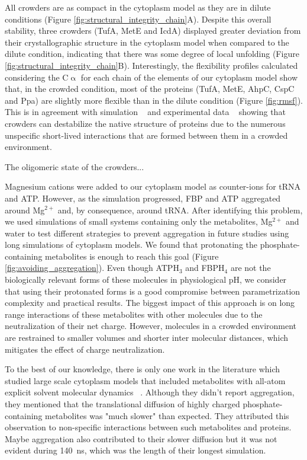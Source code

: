 \documentclass[journal=jacsat,manuscript=article]{achemso}
\begin{document}
All crowders are as compact in the cytoplasm model as they are in dilute conditions (Figure \ref{fig:structural_integrity_chain}A). Despite this overall stability, three crowders (TufA, MetE and IcdA) displayed greater deviation from their crystallographic structure in the cytoplasm model when compared to the dilute condition, indicating that there was some degree of local unfolding (Figure \ref{fig:structural_integrity_chain}B). Interestingly, the flexibility profiles calculated considering the C$\upalpha$ for each chain of the elements of our cytoplasm model show that, in the crowded condition, most of the proteins (TufA, MetE, AhpC, CspC and Ppa) are slightly more flexible than in the dilute condition (Figure \ref{fig:rmsf}). This is in agreement with simulation ~\cite{feig2011variable} and experimental data ~\cite{miklos2011protein,wang2012macromolecular} showing that crowders can destabilize the native structure of proteins due to the numerous unspecific short-lived interactions that are formed between them in a crowded environment.

The oligomeric state of the crowders... \textbf{\color{red}{MISSING RESULTS: whole crowder structural integrity using buried oligomer area}}


Magnesium cations were added to our cytoplasm model as counter-ions for tRNA and ATP. However, as the simulation progressed, FBP and ATP aggregated around Mg$^{2+}$ and, by consequence, around tRNA. After identifying this problem, we used simulations of small systems containing only the metabolites, Mg$^{2+}$ and water to test different strategies to prevent aggregation in future studies using long simulations of cytoplasm models. We found that protonating the phosphate-containing metabolites is enough to reach this goal (Figure \ref{fig:avoiding_aggregation}). Even though ATPH$_3$ and FBPH$_4$ are not the biologically relevant forms of these molecules in physiological pH, we consider that using their protonated forms is a good compromise between parametrization complexity and practical results. The biggest impact of this approach is on long range interactions of these metabolites with other molecules due to the neutralization of their net charge. However, molecules in a crowded environment are restrained to smaller volumes and shorter inter molecular distances, which mitigates the effect of charge neutralization.

To the best of our knowledge, there is only one work in the literature which studied large scale cytoplasm models that included metabolites with all-atom explicit solvent molecular dynamics ~\cite{yu2016biomolecular}. Although they didn't report aggregation, they mentioned that the translational diffusion of highly charged phosphate-containing metabolites was "much slower" than expected. They attributed this observation to non-specific interactions between such metabolites and proteins. Maybe aggregation also contributed to their slower diffusion but it was not evident during \SI{140}{\nano\second}, which was the length of their longest simulation.
\end{document}
